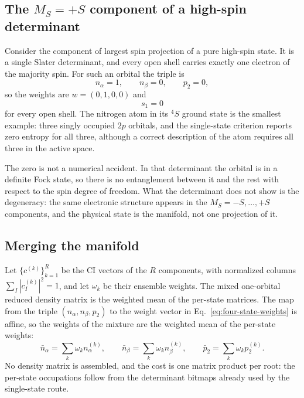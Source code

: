 \subsection{The $M_S=+S$ component of a high-spin determinant}

Consider the component of largest spin projection of a pure
high-spin state.  It is a single Slater determinant, and every open
shell carries exactly one electron of the majority spin.  For such an
orbital the triple is
\begin{equation}
  n_{\alpha}=1,\qquad n_{\beta}=0,\qquad p_{2}=0,
  \label{eq:single-det-triple}
\end{equation}
so the weights are $w=(0,1,0,0)$ and
\begin{equation}
  s_{1}=0
  \label{eq:single-det-zero}
\end{equation}
for every open shell.  The nitrogen atom in its $^{4}S$ ground state
is the smallest example: three singly occupied $2p$ orbitals, and the
single-state criterion reports zero entropy for all three, although a
correct description of the atom requires all three in the active
space.

The zero is not a numerical accident.  In that determinant the
orbital is in a definite Fock state, so there is no entanglement
between it and the rest with respect to the spin degree of freedom.
What the determinant does not show is the degeneracy: the same
electronic structure appears in the $M_S=-S,\dots,+S$ components, and
the physical state is the manifold, not one projection of it.

\subsection{Merging the manifold}

Let $\{c^{(k)}\}_{k=1}^{R}$ be the CI vectors of the $R$ components,
with normalized columns $\sum_{I}|c^{(k)}_{I}|^{2}=1$, and let
$\omega_{k}$ be their ensemble weights.  The mixed one-orbital
reduced density matrix is the weighted mean of the per-state
matrices.  The map from the triple $(n_{\alpha},n_{\beta},p_{2})$ to
the weight vector in Eq.~\eqref{eq:four-state-weights} is affine, so
the weights of the mixture are the weighted mean of the per-state
weights:
\begin{equation}
  \bar{n}_{\alpha}=\sum_{k}\omega_{k}n^{(k)}_{\alpha},\qquad
  \bar{n}_{\beta}=\sum_{k}\omega_{k}n^{(k)}_{\beta},\qquad
  \bar{p}_{2}=\sum_{k}\omega_{k}p^{(k)}_{2}.
  \label{eq:manifold-mean}
\end{equation}
No density matrix is assembled, and the cost is one matrix product per
root: the per-state occupations follow from the determinant bitmaps
already used by the single-state route.

